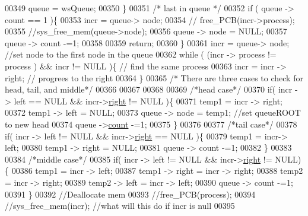 \begin{DoxyCode}
{00349                 queue = wsQueue;
00350         \}
00351         \textcolor{comment}{/* last in queue */}
00352         \textcolor{keywordflow}{if} ( queue -> count == 1 )\{
00353                 incr = queue-> node;
00354                \textcolor{comment}{//       free\_PCB(incr->process);}
00355                 \textcolor{comment}{//sys\_free\_mem(queue->node);}
00356                 queue -> node = NULL;
00357                 queue -> count -=1;
00358                 
00359                 \textcolor{keywordflow}{return};
00360         \}
00361         incr = queue-> node; \textcolor{comment}{//set node to the first node in the queue}
00362         \textcolor{keywordflow}{while} ( (incr -> process != process ) && incr != NULL )\{ \textcolor{comment}{// find the same
       process}
00363                         incr = incr -> right; \textcolor{comment}{// progrees to the right }
00364         \}
00365         \textcolor{comment}{/* There are three cases to check for head, tail, and middle*/}
00366         
00367         
00368         
00369         \textcolor{comment}{/*head case*/}
00370         \textcolor{keywordflow}{if}( incr -> left == NULL && incr->\hyperlink{structpage_a72bca7218659f6f6e4e94cc0bacc26d1}{right} != NULL )\{ 
00371                 temp1 = incr -> right;
00372                 temp1 -> left  = NULL;
00373                 queue -> node = temp1; \textcolor{comment}{//set queueROOT to new head}
00374                 queue ->\hyperlink{structroot_afa78d0408d4af29e936332a04739d59c}{count} -=1;
00375         \}
00376         
00377         \textcolor{comment}{/*tail case*/}
00378         \textcolor{keywordflow}{if}( incr -> left != NULL && incr->\hyperlink{structpage_a72bca7218659f6f6e4e94cc0bacc26d1}{right} == NULL )\{
00379                 temp1 = incr-> left;
00380                 temp1 -> right  = NULL;
00381                 queue -> count -=1;
00382         \}
00383         
00384         \textcolor{comment}{/*middle case*/}
00385         \textcolor{keywordflow}{if}( incr -> left != NULL && incr->\hyperlink{structpage_a72bca7218659f6f6e4e94cc0bacc26d1}{right} != NULL)\{
00386                 temp1 = incr -> left;
00387                 temp1 -> right = incr -> right;
00388                 temp2 = incr -> right;
00389                 temp2 -> left = incr -> left;
00390                 queue -> count -=1;
00391         \}
00392         \textcolor{comment}{//Deallocate mem}
00393         \textcolor{comment}{//free\_PCB(process);}
00394         \textcolor{comment}{//sys\_free\_mem(incr); //what will this do if incr is null}
00395         
}
\end{DoxyCode}
